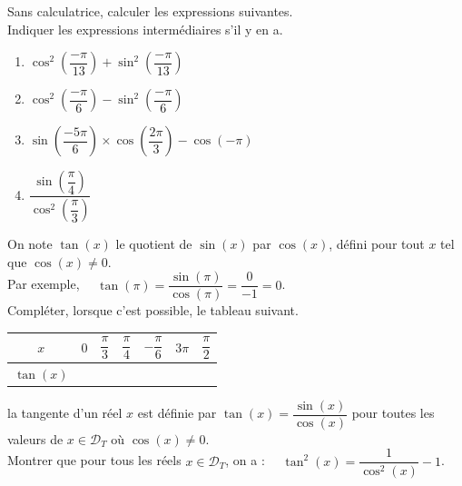 \documentclass[a4paper,11pt,exos]{nsi} %
\begin{document}
\exo{}
Sans calculatrice, calculer les expressions suivantes.\\
Indiquer les expressions intermédiaires s'il y en a.
\begin{multicols}{2}
	\begin{enumerate}
		\item 	$\cos^2\left(\dfrac{-\pi}{13}\right)+\sin^2\left(\dfrac{-\pi}{13}\right)$
		\item 	$\cos^2\left(\dfrac{-\pi}{6}\right)	-\sin^2\left(\dfrac{-\pi}{6}\right)$
		\item	$\sin\left(\dfrac{-5\pi}{6}\right)\times \cos\left(\dfrac{2\pi}{3}\right)-\cos(-\pi)$
		\item	$\dfrac{\sin\left(\dfrac{\pi}{4}\right)}{\cos^2\left(\dfrac{\pi}{3}\right)}$
	\end{enumerate}
\end{multicols}



\exo{}
On note $\tan(x)$ le quotient de $\sin(x)$ par $\cos(x)$, défini pour tout $x$ tel que $\cos(x)\neq0$.\\
Par exemple, $\quad \tan(\pi)=\dfrac{\sin(\pi)}{\cos(\pi)}=\dfrac{0}{-1}=0$.\\[.5em]
Compléter, lorsque c'est possible, le tableau suivant.
\begin{center}
	\renewcommand{\arraystretch}{2}
	\begin{tabular}{|c|c|c|c|c|c|c|}
		\hline
		\cellcolor{UGLiOrange}$x$ & $0$ & $\dfrac{\pi}{3}$ & $\dfrac{\pi}{4}$ & $-\dfrac{\pi}{6}$ & $3\pi$ & $\dfrac{\pi}{2}$ \\
		\hline
		\cellcolor{UGLiOrange} $\tan(x)$ & \hspace{1cm} & \hspace{1cm} & \hspace{1cm} & \hspace{1cm} & \hspace{1cm} & \hspace{1cm} \\
		\hline
	\end{tabular}
\end{center}
\vspace{.5cm}

\exo{}
la tangente d'un réel $x$ est définie par $\tan(x)=\dfrac{\sin(x)}{\cos(x)}$ pour toutes les valeurs de $x\in\mathcal{D}_T$ où $\cos(x)\neq0$.\\
Montrer que pour tous les réels $x\in \mathcal{D}_T$, on a : $\quad\tan^2(x)=\dfrac{1}{\cos^2(x)}-1$.
\end{document}
